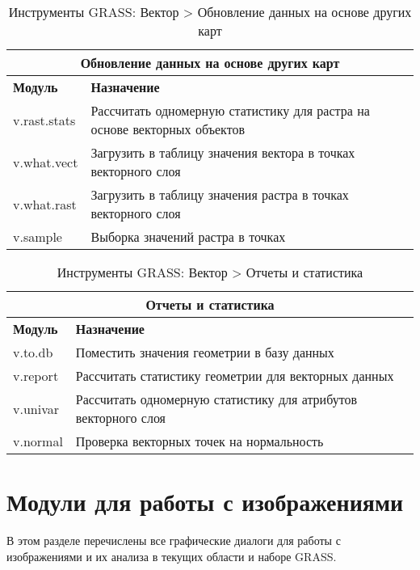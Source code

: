{\renewcommand{\arraystretch}{0.7}
\begin{table}[H]
\centering
 \begin{tabular}{|p{4cm}|p{11cm}|}
  \hline \multicolumn{2}{|c|}{\textbf{Обновление данных на основе других карт}} \\
  \hline \textbf{Модуль} & \textbf{Назначение} \\
  \hline v.rast.stats & Рассчитать одномерную статистику для растра на
  основе векторных объектов \\
  \hline v.what.vect & Загрузить в таблицу значения вектора в точках
  векторного слоя \\
  \hline v.what.rast & Загрузить в таблицу значения растра в точках
  векторного слоя \\
  \hline v.sample & Выборка значений растра в точках \\
\hline
\end{tabular}
\caption{Инструменты GRASS: Вектор > Обновление данных на основе других карт}
\end{table}}

{\renewcommand{\arraystretch}{0.7}
\begin{table}[H]
\centering
 \begin{tabular}{|p{4cm}|p{11cm}|}
  \hline \multicolumn{2}{|c|}{\textbf{Отчеты и статистика}} \\
  \hline \textbf{Модуль} & \textbf{Назначение} \\
  \hline v.to.db & Поместить значения геометрии в базу данных \\
  \hline v.report & Рассчитать статистику геометрии для векторных данных \\
  \hline v.univar & Рассчитать одномерную статистику для атрибутов
  векторного слоя \\
  \hline v.normal & Проверка векторных точек на нормальность \\
\hline
\end{tabular}
\caption{Инструменты GRASS: Вектор > Отчеты и статистика}
\end{table}}

\section{Модули для работы с изображениями}

В этом разделе перечислены все графические диалоги для работы с
изображениями и их анализа в текущих области и наборе GRASS.

